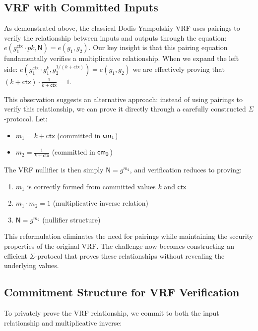 \subsection{VRF with Committed Inputs}
As demonstrated above, the classical Dodis-Yampolskiy VRF uses pairings to verify the relationship between inputs and outputs through the equation: $e(g_1^{\textsf{ctx}} \cdot pk, \mathsf{N}) = e(g_1, g_2)$. Our key insight is that this pairing equation fundamentally verifies a multiplicative relationship. When we expand the left side: $e(g_1^{\textsf{ctx}} \cdot g_1^k, g_2^{1/(k + \textsf{ctx})}) = e(g_1, g_2)$ we are effectively proving that $(k + \textsf{ctx}) \cdot \frac{1}{k + \textsf{ctx}} = 1$. 

This observation suggests an alternative approach: instead of using pairings to verify this relationship, we can prove it directly through a carefully constructed $\Sigma$-protocol. Let:
\begin{itemize}
    \item $m_1 = k + \textsf{ctx}$ (committed in $\mathsf{cm}_1$)
    \item $m_2 = \frac{1}{k + \textsf{ctx}}$ (committed in $\mathsf{cm}_2$)
\end{itemize}

The VRF nullifier is then simply $\mathsf{N} = g^{m_2}$, and verification reduces to proving:
\begin{enumerate}
    \item $m_1$ is correctly formed from committed values $k$ and $\textsf{ctx}$
    \item $m_1 \cdot m_2 = 1$ (multiplicative inverse relation)
    \item $\mathsf{N} = g^{m_2}$ (nullifier structure)
\end{enumerate}

This reformulation eliminates the need for pairings while maintaining the security properties of the original VRF. The challenge now becomes constructing an efficient $\Sigma$-protocol that proves these relationships without revealing the underlying values.



\subsection{Commitment Structure for VRF Verification}
To privately prove the VRF relationship, we commit to both the input relationship and multiplicative inverse:

    
